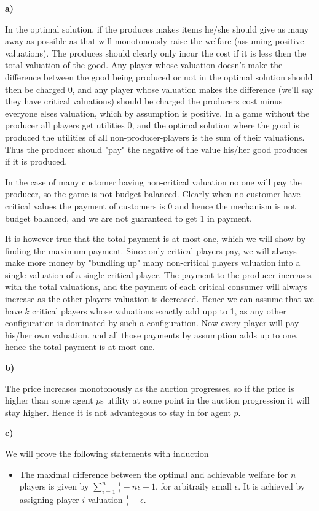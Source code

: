 \textbf{a)}

In the optimal solution, if the produces makes items he/she should give as many away as possible as that will monotonously raise the welfare (assuming positive valuations). The produces should clearly only incur the cost if it is less then the total valuation of the good. Any player whose valuation doesn't make the difference between the good being produced or not in the optimal solution should then be charged 0, and any player whose valuation makes the difference (we'll say they have critical valuations) should be charged the producers cost minus everyone elses valuation, which by assumption is positive. In a game without the producer all players get utilities 0, and the optimal solution where the good is produced the utilities of all non-producer-players is the sum of their valuations. Thus the producer should "pay" the negative of the value his/her good produces if it is produced.

In the case of many customer having non-critical valuation no one will pay the producer, so the game is not budget balanced. Clearly when no customer have critical values the payment of customers is 0 and hence the mechanism is not budget balanced, and we are not guaranteed to get 1 in payment.

It is however true that the total payment is at most one, which we will show by finding the maximum payment. Since only critical players pay, we will always make more money by "bundling up" many non-critical players valuation into a single valuation of a single critical player. The payment to the producer increases with the total valuations, and the payment of each critical consumer will always increase as the other players valuation is decreased. Hence we can assume that we have $k$ critical players whose valuations exactly add upp to 1, as any other configuration is dominated by such a configuration. Now every player will pay his/her own valuation, and all those payments by assumption adds up to one, hence the total payment is at most one.

\textbf{b)}

The price increases monotonously as the auction progresses, so if the price is higher than some agent $p$s utility at some point in the auction progression it will stay higher. Hence it is not advantegous to stay in for agent $p$.

\textbf{c)}

We will prove the following statements with induction

\begin{itemize}
\item The maximal difference between the optimal and achievable welfare for $n$ players is given by $\sum_{i=1}^n \frac{1}{i} - n \epsilon - 1$, for arbitraily small $\epsilon$. It is achieved by assigning player $i$ valuation $\frac{1}{i} - \epsilon$.

\end{itemize}


